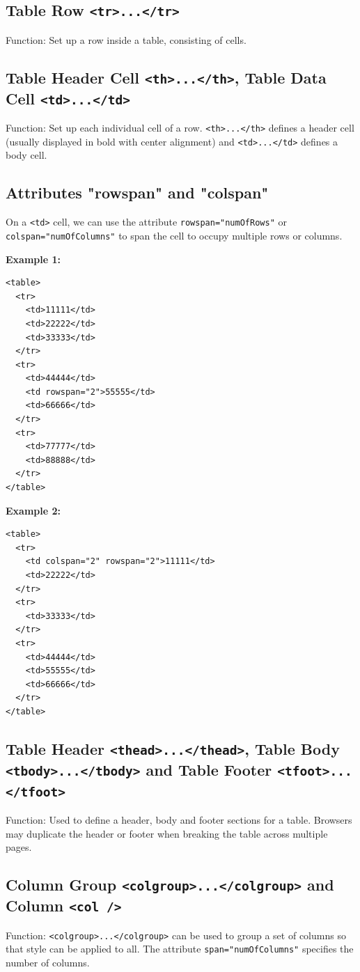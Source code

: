 \documentclass[12pt,a4paper]{article}
\begin{document}
\subsection*{Table Row \texttt{<tr>...</tr>}}
Function: Set up a row inside a table, consisting of cells.

\subsection*{Table Header Cell \texttt{<th>...</th>}, Table Data Cell \texttt{<td>...</td>}}
Function: Set up each individual cell of a row. \texttt{<th>...</th>} defines a header cell (usually displayed in bold with center alignment) and \texttt{<td>...</td>} defines a body cell.

\subsection*{Attributes "rowspan" and "colspan"}
On a \texttt{<td>} cell, we can use the attribute \texttt{rowspan="numOfRows"} or \texttt{colspan="numOfColumns"} to span the cell to occupy multiple rows or columns.

\textbf{Example 1:}
\begin{verbatim}
<table>
  <tr>
    <td>11111</td>
    <td>22222</td>
    <td>33333</td>
  </tr>
  <tr>
    <td>44444</td>
    <td rowspan="2">55555</td>
    <td>66666</td>
  </tr>
  <tr>
    <td>77777</td>
    <td>88888</td>
  </tr>
</table>
\end{verbatim}

\textbf{Example 2:}
\begin{verbatim}
<table>
  <tr>
    <td colspan="2" rowspan="2">11111</td>
    <td>22222</td>
  </tr>
  <tr>
    <td>33333</td>
  </tr>
  <tr>
    <td>44444</td>
    <td>55555</td>
    <td>66666</td>
  </tr>
</table>
\end{verbatim}

\subsection*{Table Header \texttt{<thead>...</thead>}, Table Body \texttt{<tbody>...</tbody>} and Table Footer \texttt{<tfoot>...</tfoot>}}
Function: Used to define a header, body and footer sections for a table. Browsers may duplicate the header or footer when breaking the table across multiple pages.

\subsection*{Column Group \texttt{<colgroup>...</colgroup>} and Column \texttt{<col />}}
Function: \texttt{<colgroup>...</colgroup>} can be used to group a set of columns so that style can be applied to all. The attribute \texttt{span="numOfColumns"} specifies the number of columns.
\end{document}
